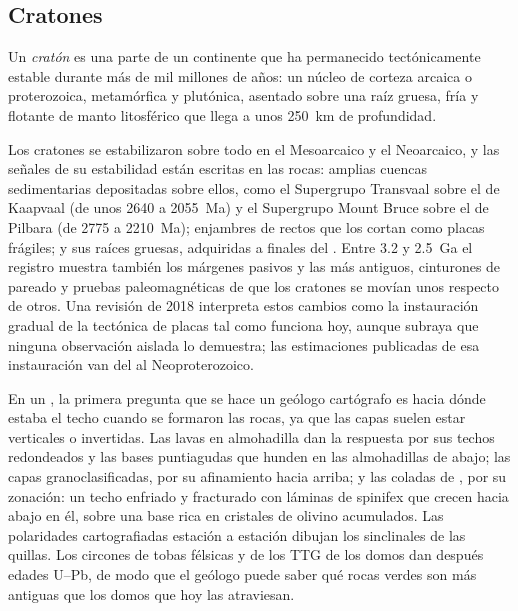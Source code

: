 \subsection*{Cratones}

\begin{definition}[Cratón]\label{def:b2:precambrian-earth:craton}
Un \emph{cratón} es una parte de un continente que ha permanecido tectónicamente estable
durante más de mil millones de años: un núcleo de corteza arcaica o proterozoica, metamórfica y
plutónica, asentado sobre una raíz gruesa, fría y flotante de manto litosférico que llega a unos
\qty{250}{km} de profundidad.
\end{definition}

Los cratones se estabilizaron sobre todo en el Mesoarcaico y el Neoarcaico, y las señales de su
estabilidad están escritas en las rocas: amplias cuencas sedimentarias depositadas sobre ellos, como el
Supergrupo Transvaal sobre el  de Kaapvaal (de unos 2640 a \qty{2055}{Ma}) y el Supergrupo
Mount Bruce sobre el de Pilbara (de 2775 a \qty{2210}{Ma}); enjambres de  rectos que los cortan como
placas frágiles; y sus raíces gruesas, adquiridas a finales del . Entre 3.2 y
\qty{2.5}{Ga} el registro muestra también los márgenes pasivos y las  más antiguos, cinturones
de  pareado y pruebas paleomagnéticas de que los cratones se movían unos respecto de otros.
Una revisión de 2018 interpreta estos cambios como la instauración gradual de la tectónica de placas tal como funciona
hoy, aunque subraya que ninguna observación aislada lo demuestra; las estimaciones publicadas de esa
instauración van del  al Neoproterozoico.

\begin{inthefield}
En un , la primera pregunta que se hace un geólogo cartógrafo es hacia dónde estaba el techo cuando
se formaron las rocas, ya que las capas suelen estar verticales o invertidas. Las lavas en almohadilla dan la respuesta
por sus techos redondeados y las bases puntiagudas que hunden en las almohadillas de abajo; las capas granoclasificadas, por
su afinamiento hacia arriba; y las coladas de , por su zonación: un techo enfriado y fracturado con
láminas de spinifex que crecen hacia abajo en él, sobre una base rica en cristales de olivino acumulados. Las
polaridades cartografiadas estación a estación dibujan los sinclinales de las quillas. Los circones de tobas félsicas
y de los TTG de los domos dan después edades U--Pb, de modo que el geólogo puede saber qué
rocas verdes son más antiguas que los domos que hoy las atraviesan.
\end{inthefield}

